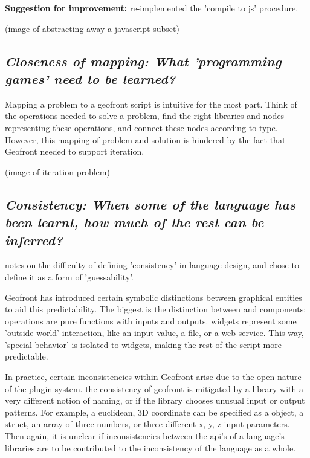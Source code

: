 \textbf{Suggestion for improvement:} re-implemented the 'compile to js' procedure.

(image of abstracting away a javascript subset)



\subsection*{\emph{Closeness of mapping: What 'programming games' need to be learned?}}

Mapping a problem to a geofront script is intuitive for the most part.
Think of the operations needed to solve a problem, 
find the right libraries and nodes representing these operations,
and connect these nodes according to type. 
However, this mapping of problem and solution is hindered by the fact that Geofront needed to support iteration. 

(image of iteration problem)



\subsection*{\emph{Consistency: When some of the language has been learnt, how much of the rest can be inferred? }}

\cite[]{green_usability_1996} notes on the difficulty of defining 'consistency' in language design, and chose to define it as a form of 'guessability'.

Geofront has introduced certain symbolic distinctions between graphical entities to aid this predictability. 
The biggest is the distinction between  and  components: 
operations are pure functions with inputs and outputs. 
widgets represent some 'outside world' interaction, like an input value, a file, or a web service. 
This way, 'special behavior' is isolated to widgets, making the rest of the script more predictable. 

In practice, certain inconsistencies within Geofront arise due to the open nature of the plugin system. 
the consistency of geofront is mitigated by a library with a very different notion of naming, or if the library chooses unusual input or output patterns. 
For example, a euclidean, 3D coordinate can be specified as a  object, a struct, an array of three numbers, or three different x, y, z input parameters.
Then again, it is unclear if inconsistencies between the api's of a language's libraries are to be contributed to the inconsistency of the language as a whole. 


